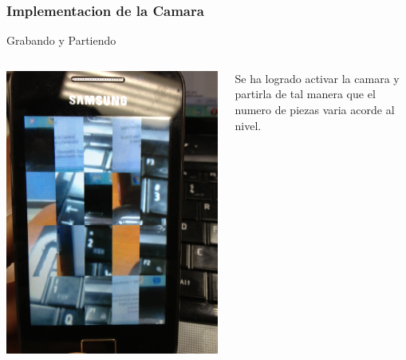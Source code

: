 \documentclass[serif,11pt]{beamer}
\begin{document}
		\begin{frame}
			\frametitle{Implementacion de la Camara}
				\begin{block}{Grabando y Partiendo}
					\begin{columns}
						 \hspace{0.1cm}
						\includegraphics[width=\textwidth]{vidcam} 

						Se ha logrado activar la camara y partirla de tal manera que el numero de piezas varia acorde al nivel.

					\end{columns}
				\end{block}
		\end{frame}
\end{document}
